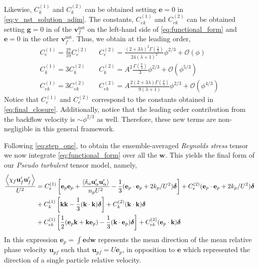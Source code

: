 Likewise, $C^{(1)}_k$ and $C^{(2)}_k$ can be obtained setting $\textbf{e}=0$ in \ref{eq:v_nst_solution_adim}. 
The constants, $C^{(1)}_{ek}$ and $C^{(2)}_{ek}$ can be obtained setting $\textbf{g} = 0$ in of the $\textbf{v}_f^\text{nst}$ on the left-hand side of \ref{eq:functional_form} and $\textbf{e}=0$ in the other $\textbf{v}_f^\text{nst}$. 
Thus, we obtain at the leading order, 
\begin{align}
    C_e^{(1)} =
    \frac{27}{10}
    C_e^{(2)}
    &&  C_e^{(2)} =
    \frac{(2+3\lambda)^2 \Gamma(\frac{1}{3})}{24(\lambda+1)^2}\phi^{2/3}
    + \mathcal{O}(\phi)
    \\
    C_k^{(1)} =
    3
    C_k^{(2)}
    && C_k^{(2)} =
    A^2 \frac{\Gamma(\frac{7}{3})}{3}\phi^{2/3}
    + \mathcal{O}(\phi^{5/3})
    \\
    C_{ek}^{(1)} =
    3
    C_{ek}^{(2)}
    && C_{ek}^{(2)} =
    A\frac{2 (2+3\lambda) \Gamma(\frac{4}{3})}{9(\lambda+1)}\phi^{2/3}
    + \mathcal{O}(\phi^{4/3})
    \label{eq:constants}
\end{align}
Notice that $C_e^{(1)}$ and $C_e^{(2)}$ correspond to the constants obtained in \ref{eq:final_closure}. 
Additionally, notice that the leading order contribution from the backflow velocity is $\sim \phi^{2/3}$ as well. 
Therefore, these new terms are non-negligible in this general framework. 


Following \ref{eq:step_one}, to obtain the ensemble-averaged \textit{Reynolds stress} tensor we now integrate  \ref{eq:functional_form} over all the $\textbf{w}$.
This yields the final form of our \textit{Pseudo turbulent} tensor model, namely, 
\begin{align}
    \frac{\avg{\chi_f \textbf{u}_f'\textbf{u}_f'}}{U^2}
    &= 
    C^{(1)}_e \left[
        \textbf{e}_p\textbf{e}_p
        + \frac{\pavg{\textbf{u}_\alpha'\textbf{u}_\alpha'}}{n_p U^2}
         - \frac{1}{3}(\textbf{e}_p\cdot \textbf{e}_p+2k_p/U^2)\bm\delta
    \right]
    + C^{(2)}_e 
    (\textbf{e}_p\cdot \textbf{e}_p+2k_p/U^2)\bm\delta \nonumber \\
    &+ C^{(1)}_k  \left[
        \textbf{kk}
         - \frac{1}{3}(\textbf{k}\cdot \textbf{k})\bm\delta
    \right]
    +C^{(2)}_k 
    (\textbf{k}\cdot \textbf{k})\bm\delta \nonumber \\
    &+ C^{(1)}_{ek} \left[
        \frac{1}{2}
        (\textbf{e}_p\textbf{k}  + \textbf{k} \textbf{e}_p)
         - \frac{1}{3}(\textbf{k}\cdot \textbf{e}_p)\bm\delta
    \right]
    + C^{(2)}_{ek}
    (\textbf{e}_p\cdot \textbf{k})\bm\delta 
    \label{eq:functional_form_avg}
\end{align}
In this expression $\textbf{e}_p = \int \textbf{e} d\textbf{w} $ represents the mean direction of the mean relative phase velocity $\textbf{u}_{pf}$ such that $\textbf{u}_{pf} = U \textbf{e}_p$, in opposition to $\textbf{e}$ which represented the direction of a single particle relative velocity. 



